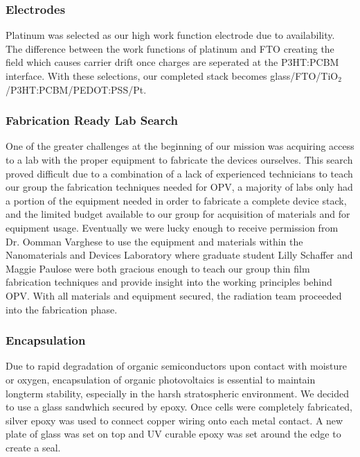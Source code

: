 \subsubsection{Electrodes}
	
	Platinum was selected as our high work function electrode due to availability. The difference between the work functions of platinum and FTO creating the field which causes carrier drift once charges are seperated at the P3HT:PCBM interface. With these selections, our completed stack becomes \linebreak glass/FTO/TiO$_2$/P3HT:PCBM/PEDOT:PSS/Pt.\\
	
\subsubsection{Fabrication Ready Lab Search}
	
	One of the greater challenges at the beginning of our mission was acquiring access to a lab with the proper equipment to fabricate the devices ourselves. This search proved difficult due to a combination of a lack of experienced technicians to teach our group the fabrication techniques needed for OPV, a majority of labs only had a portion of the equipment needed in order to fabricate a complete device stack, and the limited budget available to our group for acquisition of materials and for equipment usage. Eventually we were lucky enough to receive permission from Dr. Oomman Varghese to use the equipment and materials within the Nanomaterials and Devices Laboratory where graduate student Lilly Schaffer and Maggie Paulose were both gracious enough to teach our group thin film fabrication techniques and provide insight into the working principles behind OPV. With all materials and equipment secured, the radiation team proceeded into the fabrication phase. \\
	
\subsubsection{Encapsulation}

Due to rapid degradation of organic semiconductors upon contact with moisture or oxygen, encapsulation of organic photovoltaics is essential to maintain longterm stability, especially in the harsh stratospheric environment. We decided to use a glass sandwhich secured by epoxy. Once cells were completely fabricated, silver epoxy was used to connect copper wiring onto each metal contact. A new plate of glass was set on top and UV curable epoxy was set around the edge to create a seal.
	
